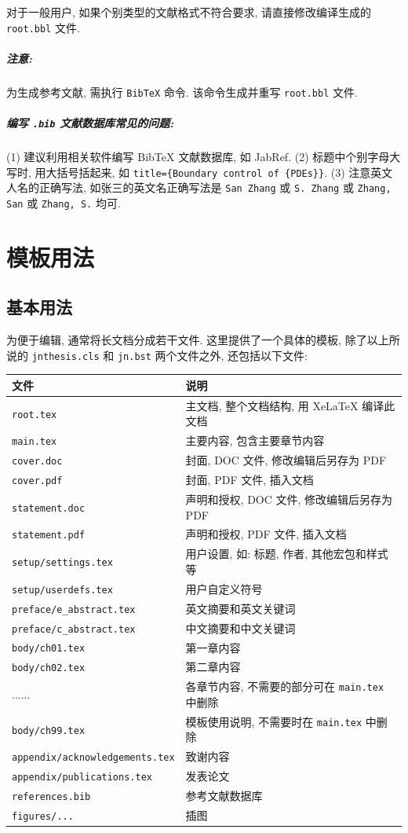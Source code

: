 对于一般用户, 如果个别类型的文献格式不符合要求, 请直接修改编译生成的 {\tt root.bbl} 文件.

\subparagraph{注意:} 为生成参考文献, 需执行 {\tt BibTeX} 命令. 该命令生成并重写 {\tt root.bbl} 文件.

\subparagraph{编写 {\tt .bib} 文献数据库常见的问题:}
(1) 建议利用相关软件编写 BibTeX 文献数据库, 如 JabRef.
(2) 标题中个别字母大写时, 用大括号括起来, 如 {\tt title=\{Boundary control of \{PDEs\}\}}. (3) 注意英文人名的正确写法, 如张三的英文名正确写法是 {\tt San Zhang} 或 {\tt S. Zhang} 或 {\tt Zhang, San} 或 {\tt Zhang, S.} 均可.

\section{模板用法}

\subsection{基本用法}

为便于编辑, 通常将长文档分成若干文件.
这里提供了一个具体的模板,
除了以上所说的 {\tt jnthesis.cls} 和 {\tt jn.bst} 两个文件之外,
还包括以下文件:

\begin{tabular}{ll}
\hline
文件 & 说明\\
\hline
{\tt root.tex} & 主文档, 整个文档结构, 用 XeLaTeX 编译此文档\\
{\tt main.tex} & 主要内容, 包含主要章节内容\\
\hline
{\tt cover.doc} & 封面, DOC 文件, 修改编辑后另存为 PDF\\
{\tt cover.pdf} & 封面, PDF 文件, 插入文档\\
{\tt statement.doc} & 声明和授权, DOC 文件, 修改编辑后另存为 PDF\\
{\tt statement.pdf} & 声明和授权, PDF 文件, 插入文档\\
\hline
{\tt setup/settings.tex} & 用户设置, 如: 标题, 作者, 其他宏包和样式等\\
{\tt setup/userdefs.tex} & 用户自定义符号\\
\hline
{\tt preface/e\_abstract.tex} & 英文摘要和英文关键词\\
{\tt preface/c\_abstract.tex} & 中文摘要和中文关键词\\
\hline
{\tt body/ch01.tex} & 第一章内容\\
{\tt body/ch02.tex} & 第二章内容\\
...... & 各章节内容, 不需要的部分可在 {\tt main.tex} 中删除\\
{\tt body/ch99.tex} & 模板使用说明, 不需要时在 {\tt main.tex} 中删除\\
\hline
{\tt appendix/acknowledgements.tex} & 致谢内容\\
{\tt appendix/publications.tex} & 发表论文\\
\hline
{\tt references.bib} & 参考文献数据库\\
{\tt figures/...} & 插图\\
\hline
\end{tabular}


